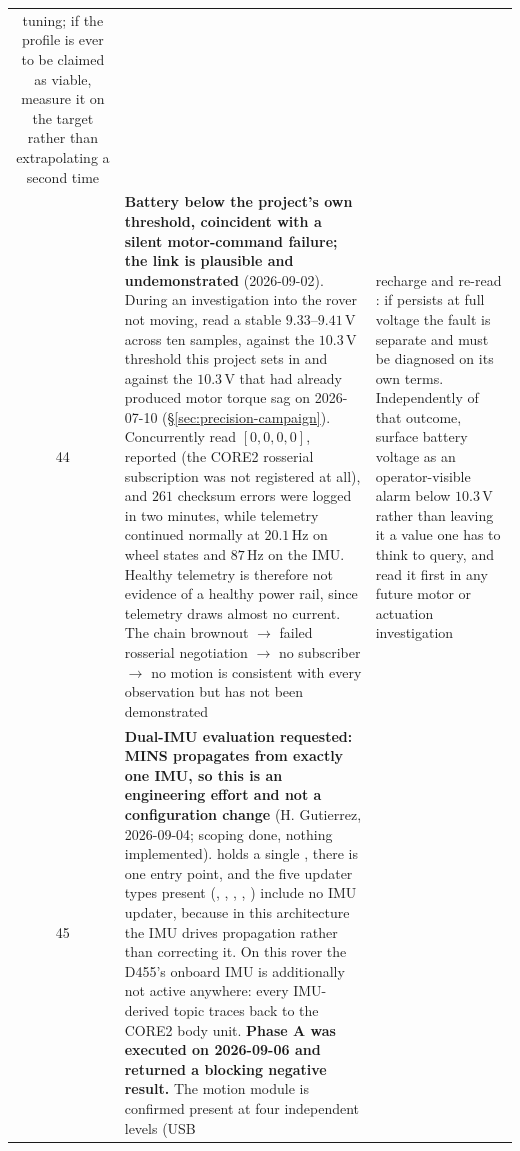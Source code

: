 \begin{longtable}{@{}cL{6.2cm}L{6.8cm}@{}}
    tuning; if the  profile is ever to be claimed as viable,
    measure it on the target rather than extrapolating a second time \\
44 & \textbf{Battery below the project's own threshold, coincident with a
    silent motor-command failure; the link is plausible and undemonstrated}
    (2026-09-02). During an investigation into the rover not moving,
     read a stable $9.33$--$9.41$\,V across ten
    samples, against the $10.3$\,V threshold this project sets in
     and against the $10.3$\,V that had already
    produced motor torque sag on 2026-07-10
    (\S\ref{sec:precision-campaign}). Concurrently
     read $[0,0,0,0]$,  reported
     (the CORE2 rosserial subscription was not
    registered at all), and $261$ checksum errors were logged in two
    minutes, while telemetry continued normally at $20.1$\,Hz on wheel
    states and $87$\,Hz on the IMU. Healthy telemetry is therefore not
    evidence of a healthy power rail, since telemetry draws almost no
    current. The chain brownout $\to$ failed rosserial negotiation $\to$ no
    subscriber $\to$ no motion is consistent with every observation but has
    not been demonstrated &
    recharge and re-read : if 
    persists at full voltage the fault is separate and must be diagnosed on
    its own terms. Independently of that outcome, surface battery voltage
    as an operator-visible alarm below $10.3$\,V rather than leaving it a
    value one has to think to query, and read it first in any future motor
    or actuation investigation \\
45 & \textbf{Dual-IMU evaluation requested: MINS propagates from exactly one
    IMU, so this is an engineering effort and not a configuration change}
    (H. Gutierrez, 2026-09-04; scoping done, nothing implemented).
     holds a single , there is one
     entry point, and the five updater types
    present (, , , ,
    ) include no IMU updater, because in this architecture the
    IMU drives propagation rather than correcting it. On this rover the
    D455's onboard IMU is additionally not active anywhere: every
    IMU-derived topic traces back to the CORE2 body unit. \textbf{Phase A
    was executed on 2026-09-06 and returned a blocking negative result.}
    The motion module is confirmed present at four independent levels (USB

\end{longtable}
